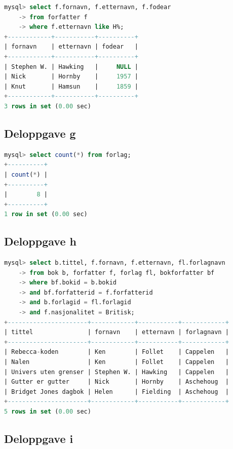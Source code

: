 \documentclass[a4paper, 12pt] {article}
\begin{document}
\begin{lstlisting}[language=SQL, label=oppg3f, caption=Oppgave 3f]
mysql> select f.fornavn, f.etternavn, f.fodear
    -> from forfatter f 
    -> where f.etternavn like H%;
+------------+-----------+----------+
| fornavn    | etternavn | fodear   |
+------------+-----------+----------+
| Stephen W. | Hawking   |     NULL |
| Nick       | Hornby    |     1957 |
| Knut       | Hamsun    |     1859 |
+------------+-----------+----------+
3 rows in set (0.00 sec)
\end{lstlisting}

\subsection{Deloppgave g}

\begin{lstlisting}[language=SQL, label=oppg3g, caption=Oppgave 3g]
mysql> select count(*) from forlag;
+----------+
| count(*) |
+----------+
|        8 |
+----------+
1 row in set (0.00 sec)
\end{lstlisting}
\newpage

\subsection{Deloppgave h}

\begin{lstlisting}[language=SQL, label=oppg3h, caption=Oppgave 3h]
mysql> select b.tittel, f.fornavn, f.etternavn, fl.forlagnavn
    -> from bok b, forfatter f, forlag fl, bokforfatter bf
    -> where bf.bokid = b.bokid
    -> and bf.forfatterid = f.forfatterid
    -> and b.forlagid = fl.forlagid
    -> and f.nasjonalitet = Britisk;
+----------------------+------------+-----------+------------+
| tittel               | fornavn    | etternavn | forlagnavn |
+----------------------+------------+-----------+------------+
| Rebecca-koden        | Ken        | Follet    | Cappelen   |
| Nalen                | Ken        | Follet    | Cappelen   |
| Univers uten grenser | Stephen W. | Hawking   | Cappelen   |
| Gutter er gutter     | Nick       | Hornby    | Aschehoug  |
| Bridget Jones dagbok | Helen      | Fielding  | Aschehoug  |
+----------------------+------------+-----------+------------+
5 rows in set (0.00 sec)
\end{lstlisting}

\subsection{Deloppgave i}
\end{document}
